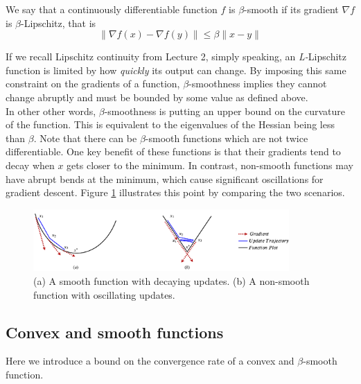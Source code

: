 \documentclass{article}
\begin{document}
\begin{defn}
We say that a continuously differentiable function $f$ is $\beta$-smooth if its gradient $\nabla f$ is $\beta$-Lipschitz, that is 
\[
	\| \nabla f(x) - \nabla f(y)\| \leq \beta \| x-y \|
\]
\end{defn}
If we recall Lipschitz continuity from Lecture 2, simply speaking, an \textit{L-}Lipschitz function is limited by how \textit{quickly} its output can change. By imposing this same constraint on the gradients of a function, $\beta$-smoothness implies they cannot change abruptly and must be bounded by some value as defined above.
\\


In other other words, $\beta$-smoothness is putting an upper bound on the curvature of the function. This is equivalent to the eigenvalues of the Hessian being less than $\beta$. Note that there can be $\beta$-smooth functions which are not twice differentiable. One key benefit of these functions is that their gradients tend to decay when $x$ gets closer to the minimum. In contrast, non-smooth functions may have abrupt bends at the minimum, which cause significant oscillations for gradient descent. Figure \ref{fig:gradient_updates} illustrates this point by comparing the two scenarios.
\begin{figure}[ht]
\centering
    \includegraphics[width=0.87\textwidth]{gradient_swing_legends.png}%
    \caption{(a) A smooth function with decaying updates. (b) A non-smooth function with oscillating updates.}
    \label{fig:gradient_updates}
\end{figure}


\subsection{Convex and smooth functions}

Here we introduce a bound on the convergence rate of a convex and $\beta$-smooth function.
\end{document}

